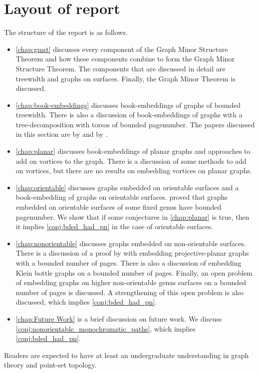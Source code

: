 \section{Layout of report}
The structure of the report is as follows.
\begin{itemize}
	\item \cref{chap:gmst} discusses every component of the Graph Minor Structure Theorem and how these components combine to form the Graph Minor Structure Theorem. The components that are discussed in detail are treewidth and graphs on surfaces. Finally, the Graph Minor Theorem is discussed.
	\item \cref{chap:book-embeddings} discusses book-embeddings of graphs of bounded treewidth. There is also a discussion of book-embeddings of graphs with a tree-decomposition with torsos of bounded pagenumber. The papers discussed in this section are by \textcite{hickingbothamStackNumberCliqueSum2023} and by \textcite{ganleyPagenumberTrees2001}. 
	\item \cref{chap:planar} discusses book-embeddings of planar graphs and approaches to add on vortices to the graph. There is a discussion of some methods to add on vortices, but there are no results on embedding vortices on planar graphs. 
	\item \cref{chap:orientable} discusses graphs embedded on orientable surfaces and a book-embedding of graphs on orientable surfaces. \textcite{heathPagenumberGenusGraphs1992} proved that graphs embedded on orientable surfaces of some fixed genus have bounded pagenumber. We show that if some conjectures in \cref{chap:planar} is true, then it implies \cref{conj:bded_had_pn} in the case of orientable surfaces. 
	\item \cref{chap:nonorientable} discusses graphs embedded on non-orientable surfaces. There is a discussion of a proof by \textcite{nakamotoBookEmbeddingProjectiveplanar2015} with embedding projective-planar graphs with a bounded number of pages. There is also a discussion of embedding Klein bottle graphs on a bounded number of pages. Finally, an open problem of embedding graphs on higher non-orientable genus surfaces on a bounded number of pages is discussed. A strengthening of this open problem is also discussed, which implies \cref{conj:bded_had_pn}.
	\item \cref{chap:Future Work} is a brief discussion on future work. We discuss \cref{conj:nonorientable_monochromatic_paths}, which implies \cref{conj:bded_had_pn}. 
\end{itemize}

Readers are expected to have at least an undergraduate understanding in graph theory and point-set topology. 
